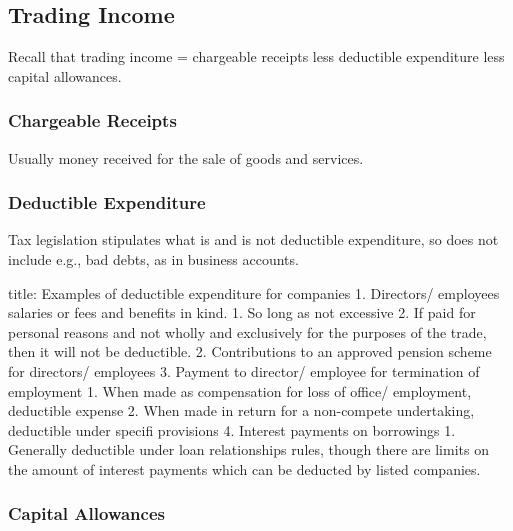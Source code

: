 \documentclass[
]{article}
\newenvironment{Shaded}{}{}
\newcommand{\NormalTok}[1]{#1}
\begin{document}
\hypertarget{trading-income}{%
\subsection{Trading Income}\label{trading-income}}

Recall that trading income = chargeable receipts less deductible
expenditure less capital allowances.

\hypertarget{chargeable-receipts}{%
\subsubsection{Chargeable Receipts}\label{chargeable-receipts}}

Usually money received for the sale of goods and services.

\hypertarget{deductible-expenditure}{%
\subsubsection{Deductible Expenditure}\label{deductible-expenditure}}

Tax legislation stipulates what is and is not deductible expenditure, so
does not include e.g., bad debts, as in business accounts.

\begin{Shaded}
\begin{Highlighting}[]
\NormalTok{title: Examples of deductible expenditure for companies}
\NormalTok{1. Directors\textquotesingle{}/ employees\textquotesingle{} salaries or fees and benefits in kind. }
\NormalTok{    1. So long as not excessive}
\NormalTok{    2. If paid for personal reasons and not wholly and exclusively for the purposes of the trade, then it will not be deductible. }
\NormalTok{2. Contributions to an approved pension scheme for directors/ employees}
\NormalTok{3. Payment to director/ employee for termination of employment}
\NormalTok{    1. When made as compensation for loss of office/ employment, deductible expense}
\NormalTok{    2. When made in return for a non{-}compete undertaking, deductible under specifi provisions}
\NormalTok{4. Interest payments on borrowings}
\NormalTok{    1. Generally deductible under loan relationships rules, though there are limits on the amount of interest payments which can be deducted by listed companies. }
\end{Highlighting}
\end{Shaded}

\hypertarget{capital-allowances}{%
\subsubsection{Capital Allowances}\label{capital-allowances}}
\end{document}
